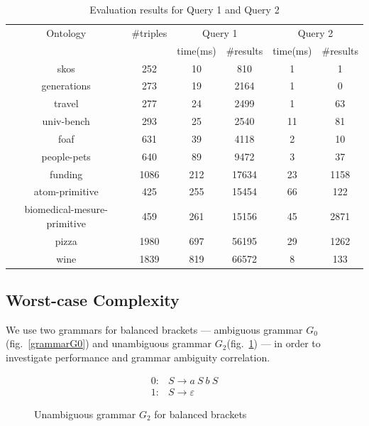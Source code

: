 \begin{table}
\centering
\caption{Evaluation results for Query 1 and Query 2}
\label{tbl1}

\begin{tabular}{ | c | c | c | c | c | c |}
\hline
Ontology & \#triples & \multicolumn{2}{|c|}{Query 1} & \multicolumn{2}{|c|}{Query 2} \\
\cline{3-6}
& & time(ms) & \#results & time(ms) & \#results \\
\hline 
\hline
skos        & 252 & 10 & 810 & 1 & 1 \\
generations & 273 & 19 & 2164 & 1 & 0 \\
travel      & 277 & 24 & 2499 & 1 & 63 \\
univ-bench  & 293 & 25 & 2540 & 11 & 81 \\
foaf        & 631 & 39 & 4118 & 2 & 10 \\
people-pets & 640 & 89 & 9472 & 3 & 37 \\
funding     & 1086 & 212 & 17634 & 23 & 1158 \\
atom-primitive & 425 & 255 & 15454 & 66 & 122 \\
biomedical-mesure-primitive & 459 & 261 & 15156 & 45 & 2871 \\
pizza       & 1980 & 697 & 56195 & 29 & 1262 \\
wine        & 1839 & 819 & 66572 & 8 & 133 \\
\hline
\end{tabular}

\end{table}

\subsection{Worst-case Complexity} 

We use two grammars for balanced brackets --- ambiguous grammar $G_0$(fig.~\ref{grammarG0}) and unambiguous grammar $G_2$(fig.~\ref{grammarG2}) --- in order to investigate performance and grammar ambiguity correlation.

\begin{figure}[ht]
   \begin{center}
   \[
\begin{array}{rl}
   0: & S \rightarrow a \ S \ b \ S \\ 
   1: & S \rightarrow \varepsilon
\end{array}
\]
   \caption{Unambiguous grammar $G_2$ for balanced brackets}
   \label{grammarG2}        
   \end{center}
\end{figure}

